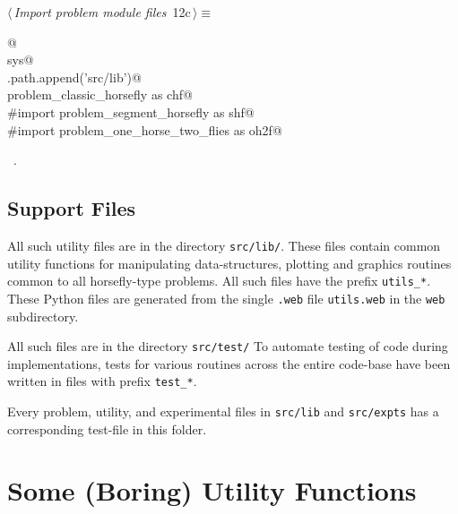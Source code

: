 \documentclass[11.5pt]{report}
\begin{document}
\begin{flushleft} \small
\begin{minipage}{\linewidth}\label{scrap3}\raggedright\small
{} $\langle\,${\itshape Import problem module files}\nobreak\ {\footnotesize {12c}}$\,\rangle\equiv$
\vspace{-1ex}
\begin{list}{}{} \item
\mbox{}\verb@   @\\
\mbox{}\verb@import sys@\\
\mbox{}\verb@sys.path.append('src/lib')@\\
\mbox{}\verb@import problem_classic_horsefly as chf@\\
\mbox{}\verb@#import problem_segment_horsefly as shf@\\
\mbox{}\verb@#import problem_one_horse_two_flies as oh2f@\\
\mbox{}\verb@@{\NWsep}
\end{list}
\vspace{-1.5ex}
\footnotesize
\begin{list}{}{\setlength{\itemsep}{-\parsep}\setlength{\itemindent}{-\leftmargin}}
\item \NWtxtMacroRefIn\ .

\item{}
\end{list}
\end{minipage}\vspace{4ex}
\end{flushleft}
\section{Support Files}

\begin{alphalist}
\item {}  All such utility files are in the directory \texttt{src/lib/}. 
 These files contain common utility functions  for manipulating data-structures, plotting 
 and graphics routines common to all horsefly-type problems. All such files have the prefix 
 \verb|utils_*|. These Python files are generated from the single \verb|.web| file \verb|utils.web| 
 in the \verb|web| subdirectory.

\item {} All such files are in the directory \texttt{src/test/}
 To automate testing of code during implementations, tests for various 
 routines across the entire code-base have been written in files with prefix
 \verb|test_*|.  
 
 Every problem, utility, and experimental files in \verb|src/lib| and \verb|src/expts| 
 has a corresponding test-file in this folder. 
\end{alphalist}\chapter{Some (Boring) Utility Functions}
\label{chap:utility-functions}
\end{document}
